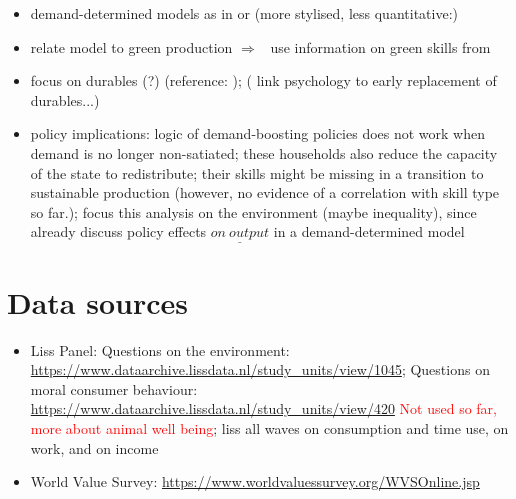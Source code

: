 \documentclass[12pt]{article}
\newcommand{\ar}{$\Rightarrow$ \ }
\newcommand{\tr}[1]{\textcolor{red}{#1}}
\begin{document}
\begin{itemize}
\item demand-determined models as in \cite{Michaillat2015AggregateUnemployment} or (more stylised, less quantitative:) \cite{Auerbach2021InequalityEconomy}
\item  relate model to green production \ar use information on green skills from \cite{Consoli2016DoCapital} 
\item focus on durables (?) (reference: \cite{McKay2021LumpyPolicy}); (\cite{Hou2020FeelingsIntentions} link psychology to early replacement of durables...)
\item policy implications: logic of demand-boosting policies does not work when demand is no longer non-satiated; these households also reduce the capacity of the state to redistribute; their skills might be missing in a transition to sustainable production (however, no evidence of a correlation with skill type so far.); focus this analysis on the environment (maybe inequality), since \cite{Auerbach2021InequalityEconomy} already discuss policy effects $\underline{on\ output}$ in a demand-determined model
\end{itemize}

%


\section{Data sources}
\begin{itemize}
\item Liss Panel: 
Questions on the environment:
\url{https://www.dataarchive.lissdata.nl/study_units/view/1045}; Questions on moral consumer behaviour: 
\url{https://www.dataarchive.lissdata.nl/study_units/view/420} \tr{Not used so far, more about animal well being};
liss all waves on consumption and time use, on work, and on income

\item World Value Survey: \url{https://www.worldvaluessurvey.org/WVSOnline.jsp}
\end{itemize}
\end{document}
